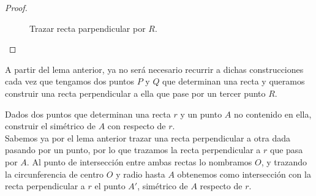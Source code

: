 \begin{lema}
\begin{proof}
\begin{description}
\begin{figure}
                \caption{Trazar recta parpendicular por $R$.}
                \label{fig:pqr_caso2}
            \end{figure}
        \end{description}
    \end{proof}
\end{lema}
A partir del lema anterior, ya no será necesario recurrir a dichas construcciones cada vez que tengamos dos puntos $P$ y $Q$ que determinan una recta y queramos construir una recta perpendicular a ella que pase por un tercer punto $R$.

\begin{ejercicio}
    Dados dos puntos que determinan una recta $r$ y un punto $A$ no contenido en ella, construir el simétrico de $A$ con respecto de $r$.\\

    \noindent
    Sabemos ya por el lema anterior trazar una recta perpendicular a otra dada pasando por un punto, por lo que trazamos la recta perpendicular a $r$ que pasa por $A$. Al punto de intersección entre ambas rectas lo nombramos $O$, y trazando la circunferencia de centro $O$ y radio hasta $A$ obtenemos como intersección con la recta perpendicular a $r$ el punto $A'$, simétrico de $A$ respecto de $r$.

    \begin{figure}[H]
        \centering
    \end{figure}
\end{ejercicio}~\\

